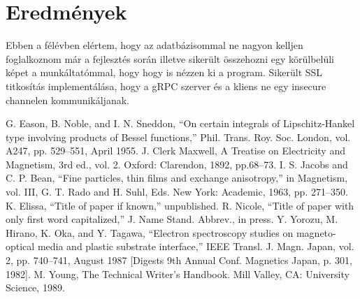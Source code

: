 \documentclass[conference]{IEEEtran}
\begin{document}
\section*{Eredmények}
Ebben a félévben elértem, hogy az adatbázisommal ne nagyon kelljen foglalkoznom már a fejlesztés során illetve sikerült összehozni egy körülbelüli képet a munkáltatómmal, hogy hogy is nézzen ki a program. Sikerült SSL titkosítás implementálása, hogy a gRPC szerver és a kliens ne egy insecure channelen kommunikáljanak.

\begin{thebibliography}{00}
 G. Eason, B. Noble, and I. N. Sneddon, ``On certain integrals of Lipschitz-Hankel type involving products of Bessel functions,'' Phil. Trans. Roy. Soc. London, vol. A247, pp. 529--551, April 1955.
 J. Clerk Maxwell, A Treatise on Electricity and Magnetism, 3rd ed., vol. 2. Oxford: Clarendon, 1892, pp.68--73.
 I. S. Jacobs and C. P. Bean, ``Fine particles, thin films and exchange anisotropy,'' in Magnetism, vol. III, G. T. Rado and H. Suhl, Eds. New York: Academic, 1963, pp. 271--350.
 K. Elissa, ``Title of paper if known,'' unpublished.
 R. Nicole, ``Title of paper with only first word capitalized,'' J. Name Stand. Abbrev., in press.
 Y. Yorozu, M. Hirano, K. Oka, and Y. Tagawa, ``Electron spectroscopy studies on magneto-optical media and plastic substrate interface,'' IEEE Transl. J. Magn. Japan, vol. 2, pp. 740--741, August 1987 [Digests 9th Annual Conf. Magnetics Japan, p. 301, 1982].
 M. Young, The Technical Writer's Handbook. Mill Valley, CA: University Science, 1989.
\end{thebibliography}
\vspace{12pt}
\end{document}
